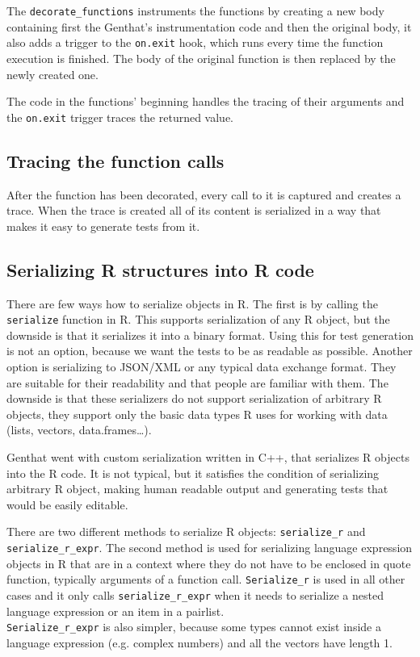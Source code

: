 \documentclass[thesis=B,english]{FITthesis}[2012/10/20]
\begin{document}
The \verb|decorate_functions| instruments the functions by creating a new body containing first the Genthat’s instrumentation code and then the original body, it also adds a trigger to the \verb|on.exit| hook, which runs every time the function execution is finished. The body of the original function is then replaced by the newly created one.

The code in the functions’ beginning handles the tracing of their arguments and the \verb|on.exit| trigger traces the returned value.

\subsection{Tracing the function calls}
After the function has been decorated, every call to it is captured and creates a trace. When the trace is created all of its content is serialized in a way that makes it easy to generate tests from it.

\subsection{Serializing R structures into R code}
There are few ways how to serialize objects in R. The first is by calling the \verb|serialize| function in R. This supports serialization of any R object, but the downside is that it serializes it into a binary format. Using this for test generation is not an option, because we want the tests to be as readable as possible. Another option is serializing to JSON/XML or any typical data exchange format. They are suitable for their readability and that people are familiar with them. The downside is that these serializers do not support serialization of arbitrary R objects, they support only the basic data types R uses for working with data (lists, vectors, data.frames…).

Genthat went with custom serialization written in C++, that serializes R objects into the R code. It is not typical, but it satisfies the condition of serializing arbitrary R object, making human readable output and generating tests that would be easily editable.

There are two different methods to serialize R objects: \verb|serialize_r| and \verb|serialize_r_expr|. The second method is used for serializing language expression objects in R that are in a context where they do not have to be enclosed in quote function, typically arguments of a function call. \verb|Serialize_r| is used in all other cases and it only calls \verb|serialize_r_expr| when it needs to serialize a nested language expression or an item in a pairlist. \\ \verb|Serialize_r_expr| is also simpler, because some types cannot exist inside a language expression (e.g. complex numbers) and all the vectors have length 1.
\end{document}
